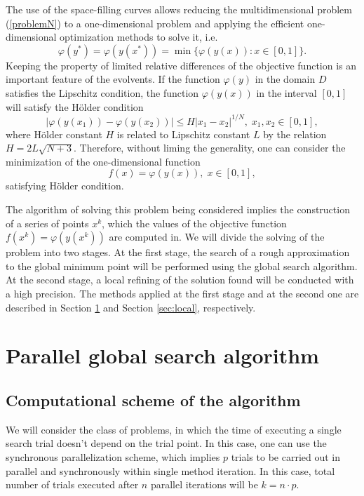 \documentclass[runningheads]{llncs}
\begin{document}
The use of the space-filling curves allows reducing the multidimensional problem (\ref{problemN}) to a one-dimensional problem and applying the efficient one-dimensional optimization methods to solve it, i.e. 
\begin{equation} \label{problem_ref}
\varphi(y^*) = \varphi(y(x^*)) = \min{\{ \varphi(y(x)): x \in [0, 1] \}}.
\end{equation}
Keeping the property of limited relative differences of the objective function is an important feature of the evolvents. If the function $\varphi(y)$ in the domain $D$ satisfies the Lipschitz condition, the function $\varphi(y(x))$ in the interval $[0,1]$ will satisfy the H{\"o}lder condition
\begin{equation} \label{holder_ref}
\left| \varphi(y(x_1)) - \varphi(y(x_2)) \right| \leq H {\left| x_1 - x_2 \right|}^{1/N}, \; x_1, x_2 \in [0,1],
\end{equation}
where H{\"o}lder constant $H$ is related to Lipschitz constant $L$ by the relation $H = 2L\sqrt{N+3}$. Therefore, without liming the generality, one can consider the minimization of the one-dimensional function 
\begin{equation} \label{minim_fun_ref}
f(x) = \varphi(y(x)), \; x \in [0,1],
\end{equation}
satisfying H{\"o}lder condition.

The algorithm of solving this problem being considered implies the construction of a series of points $x^k$, which the values of the objective function  $f(x^k) = \varphi(y(x^k))$ are computed in. We will divide the solving of the problem into two stages. At the first stage, the search of a rough approximation to the global minimum point will be performed using the global search algorithm. At the second stage, a local refining of the solution found will be conducted with a high precision. The methods applied at the first stage and at the second one are described in Section \ref{sec:global} and Section \ref{sec:local}, respectively.

\section{Parallel global search algorithm}\label{sec:global}
\subsection{Computational scheme of the algorithm}

We will consider the class of problems, in which the time of executing a single search trial doesn't depend on the trial point. In this case, one can use the synchronous parallelization scheme, which implies $p$ trials to be carried out in parallel and synchronously within single method iteration. In this case, total number of trials executed after $n$ parallel iterations will be $k=n \cdot p$.
\end{document}
